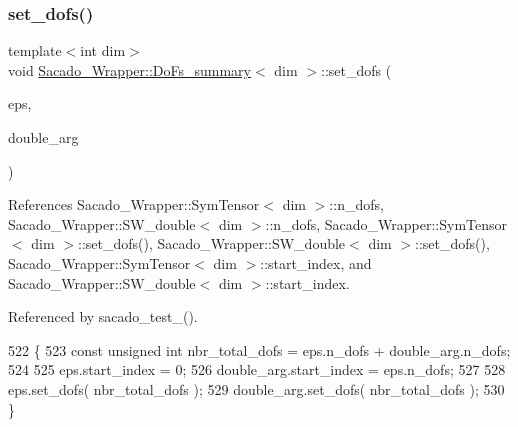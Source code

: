 \subsubsection{\texorpdfstring{set\+\_\+dofs()}{set\_dofs()}\hspace{0.1cm}{\footnotesize\ttfamily [1/3]}}
{\footnotesize\ttfamily template$<$int dim$>$ \\
void \hyperlink{classSacado__Wrapper_1_1DoFs__summary}{Sacado\+\_\+\+Wrapper\+::\+Do\+Fs\+\_\+summary}$<$ dim $>$\+::set\+\_\+dofs (\begin{DoxyParamCaption}\item[{\hyperlink{classSacado__Wrapper_1_1SymTensor}{Sym\+Tensor}$<$ dim $>$ \&}]{eps,  }\item[{\hyperlink{classSacado__Wrapper_1_1SW__double}{S\+W\+\_\+double}$<$ dim $>$ \&}]{double\+\_\+arg }\end{DoxyParamCaption})}



References Sacado\+\_\+\+Wrapper\+::\+Sym\+Tensor$<$ dim $>$\+::n\+\_\+dofs, Sacado\+\_\+\+Wrapper\+::\+S\+W\+\_\+double$<$ dim $>$\+::n\+\_\+dofs, Sacado\+\_\+\+Wrapper\+::\+Sym\+Tensor$<$ dim $>$\+::set\+\_\+dofs(), Sacado\+\_\+\+Wrapper\+::\+S\+W\+\_\+double$<$ dim $>$\+::set\+\_\+dofs(), Sacado\+\_\+\+Wrapper\+::\+Sym\+Tensor$<$ dim $>$\+::start\+\_\+index, and Sacado\+\_\+\+Wrapper\+::\+S\+W\+\_\+double$<$ dim $>$\+::start\+\_\+index.



Referenced by sacado\+\_\+test\+\_().


\begin{DoxyCode}
522     \{
523         \textcolor{keyword}{const} \textcolor{keywordtype}{unsigned} \textcolor{keywordtype}{int} nbr\_total\_dofs = eps.n\_dofs + double\_arg.n\_dofs;
524 
525         eps.start\_index = 0;
526         double\_arg.start\_index = eps.n\_dofs;
527 
528         eps.set\_dofs( nbr\_total\_dofs );
529         double\_arg.set\_dofs( nbr\_total\_dofs );
530     \}
\end{DoxyCode}
\mbox{\label{classSacado__Wrapper_1_1DoFs__summary_a875597639efab9d48f47ea5b91b56271}} 
